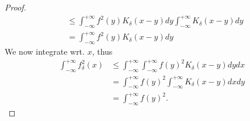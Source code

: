 \documentclass[../main.tex]{subfiles}
\begin{document}
\begin{proof}
\begin{align*}
			  & \leq  \int_{-\infty}^{+\infty} f^{2}( y) K_\delta( x-y) dy \int_{-\infty}^{+\infty} K_\delta( x-y) dy\\
			  &= \int_{-\infty}^{+\infty} f^{2}( y) K_\delta ( x-y) dy
\end{align*}
We now integrate wrt. $x$, thus
\begin{align*}
	\int_{-\infty}^{+\infty} f_\delta ^{2}( x) &\leq  \int_{-\infty}^{+\infty}\int_{-\infty}^{+\infty} f( y) ^{2} K_\delta( x-y) dydx\\
	&= \int_{-\infty}^{+\infty} f( y) ^{2}  \int_{-\infty}^{+\infty}K_\delta ( x-y) dx dy\\
	&= \int_{-\infty}^{+\infty} f( y)^{2}.
\end{align*}






\end{proof}


		
\end{document}
